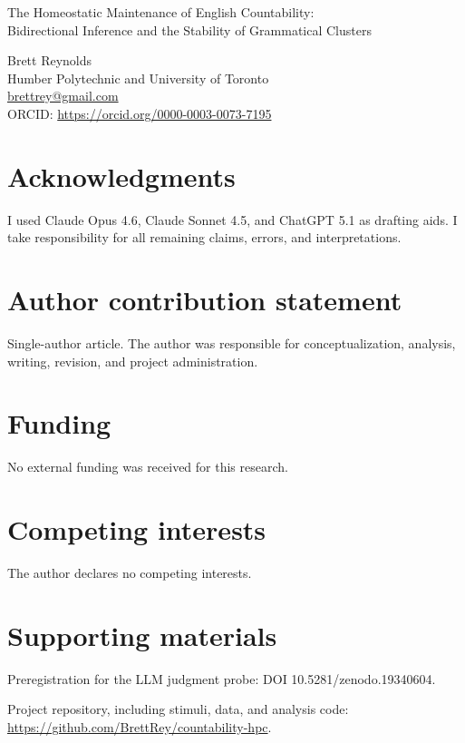 \documentclass[12pt]{article}
\begin{document}
\thispagestyle{empty}

\begin{center}
{\Large The Homeostatic Maintenance of English Countability:\\[0.3em]
Bidirectional Inference and the Stability of Grammatical Clusters\par}
\vspace{1.5em}

Brett Reynolds\\
Humber Polytechnic and University of Toronto\\
\href{mailto:brettrey@gmail.com}{brettrey@gmail.com}\\
ORCID: \url{https://orcid.org/0000-0003-0073-7195}
\end{center}

\section*{Acknowledgments}
I used Claude Opus 4.6, Claude Sonnet 4.5, and ChatGPT 5.1 as drafting aids. I take responsibility for all remaining claims, errors, and interpretations.

\section*{Author contribution statement}
Single-author article. The author was responsible for conceptualization, analysis, writing, revision, and project administration.

\section*{Funding}
No external funding was received for this research.

\section*{Competing interests}
The author declares no competing interests.

\section*{Supporting materials}
Preregistration for the LLM judgment probe: DOI 10.5281/zenodo.19340604.

Project repository, including stimuli, data, and analysis code: \url{https://github.com/BrettRey/countability-hpc}.
\end{document}
